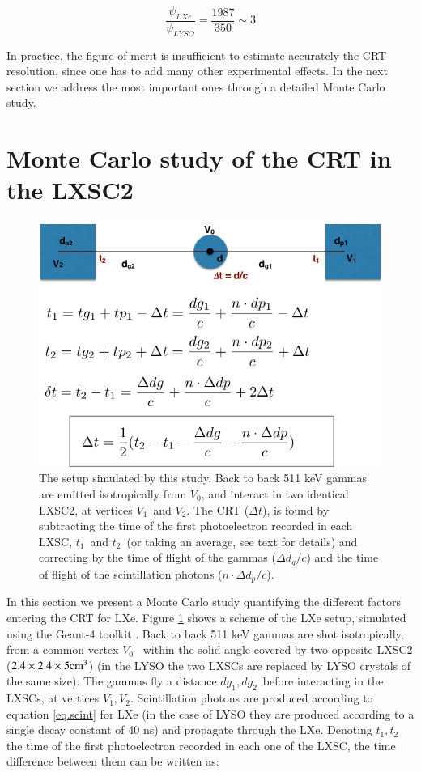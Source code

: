 \documentclass[review]{elsarticle}
\begin{document}
 \begin{equation}
\frac{\psi_{LXe}}{\psi_{LYSO}} = \frac{1987}{350} \sim 3
\label{eq.ratioScint}
\end{equation}

In practice, the figure of merit is insufficient to estimate accurately the CRT resolution, since one has to add many other experimental effects. In the next section we address the most important ones through a detailed Monte Carlo study. 

\section{Monte Carlo study of the CRT in the LXSC2} 
\label{sec.CRT}

\begin{figure}[!bhtp]
	\centering
	\includegraphics[scale=0.5]{../img/TOFSetup.png}
	\caption{The setup simulated by this study. Back to back 511 keV gammas are emitted
	isotropically from $V_0$, and interact in two identical LXSC2, at vertices $V_1$~and
	$V_2$. The CRT ($\Delta t$), is found by subtracting the time of the first photoelectron recorded
	in each LXSC, $t_1$~and $t_2$~(or taking an average, see text for details) and correcting
	by the time of flight of the gammas ($\Delta d_g/c$) and the time of flight of the scintillation photons
	($n \cdot \Delta d_p/c$). }\label{fig.setup} 
\end{figure}  

In this section we present a Monte Carlo study quantifying the different factors entering the CRT for LXe. Figure \ref{fig.setup} shows a scheme of  the LXe setup, simulated using the Geant-4 toolkit \cite{Agostinelli:2002hh} . Back to back 511 keV gammas are shot isotropically, from a common vertex $V_0$~ within the solid angle covered by two opposite LXSC2 ($2.4 \times 2.4 \times 5 {\rm cm^3}$) (in the LYSO the two LXSCs are replaced by LYSO crystals of the same size). The gammas fly a distance $dg_1, dg_2$~before interacting in the LXSCs, at vertices $V_1, V_2$. Scintillation photons are produced according to equation \ref{eq.scint} for LXe (in the case of LYSO they are produced according to a single decay constant of 40 ns) and propagate through the LXe. Denoting $t_1,t_2$ the time of the first photoelectron recorded in each one of the LXSC, the time difference between them can be written as:
\end{document}
